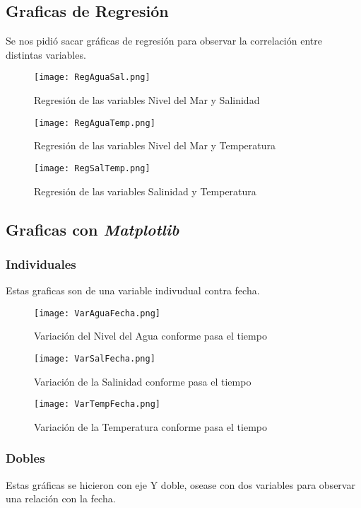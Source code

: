 \documentclass{article}
\begin{document}
\subsection{Graficas de Regresión}
Se nos pidió sacar gráficas de regresión para observar la correlación entre distintas variables.

\begin{figure}[H]
\texttt{[image: RegAguaSal.png]}
\centering
\caption{Regresión de las variables Nivel del Mar y Salinidad}
\end{figure}

\begin{figure}[H]
\texttt{[image: RegAguaTemp.png]}
\centering
\caption{Regresión de las variables Nivel del Mar y Temperatura}
\end{figure}

\begin{figure}[H]
\texttt{[image: RegSalTemp.png]}
\centering
\caption{Regresión de las variables Salinidad y Temperatura}
\end{figure}

\subsection{Graficas con \textit{Matplotlib}}
\subsubsection{Individuales}
Estas graficas son de una variable indivudual contra fecha.

\begin{figure}[H]
\texttt{[image: VarAguaFecha.png]}
\centering
\caption{Variación del Nivel del Agua conforme pasa el tiempo}
\end{figure}

\begin{figure}[H]
\texttt{[image: VarSalFecha.png]}
\centering
\caption{Variación de la Salinidad conforme pasa el tiempo}
\end{figure}

\begin{figure}[H]
\texttt{[image: VarTempFecha.png]}
\centering
\caption{Variación de la Temperatura conforme pasa el tiempo}
\end{figure}

\subsubsection{Dobles}
Estas gráficas se hicieron con eje Y doble, osease con dos variables para observar una relación con la fecha.
\end{document}
